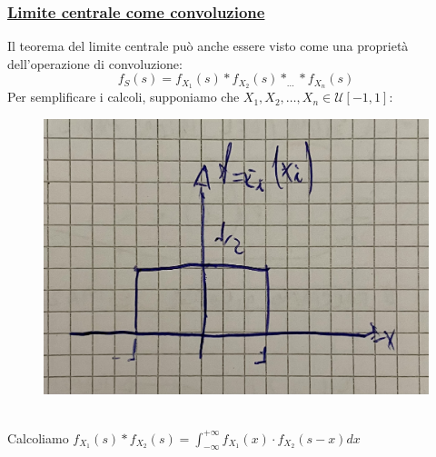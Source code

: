 \documentclass{article}
\begin{document}
\subsubsection{\underline{Limite centrale come convoluzione}}
Il teorema del limite centrale può anche essere visto come una proprietà dell'operazione di convoluzione:
\[f_S(s) = f_{X_1}(s) * f_{X_2}(s) * _{\dots} * f_{X_n}(s)\]
Per semplificare i calcoli, supponiamo che $X_1, X_2, \dots, X_n \in \mathcal{U}\left[ -1, 1 \right]$:
\begin{figure}[ht]
\centering
\includegraphics[scale=0.13]{images/84.jpeg}
\end{figure} ~\\
Calcoliamo $f_{X_1}(s)*f_{X_2}(s) = \int_{-\infty}^{+\infty} f_{X_1}(x) \cdot f_{X_2}(s-x) dx$
\end{document}
